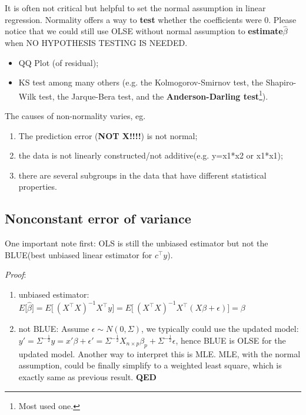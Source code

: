 It is often not critical but helpful to set the normal assumption in
linear regression. Normality offers a way to \textbf{test} whether the
coefficients were 0. Please notice that we could still use OLSE without
normal assumption to \textbf{estimate}\(\hat{\beta}\)when NO HYPOTHESIS
TESTING IS NEEDED.

\begin{itemize}
	\item
	QQ Plot (of residual);
	\item
	KS test among many others (e.g. the Kolmogorov-Smirnov test, the
	Shapiro-Wilk test, the Jarque-Bera test, and the
	\textbf{Anderson-Darling test}\footnote{Most used one.}).
\end{itemize}

The causes of non-normality varies, eg.

\begin{enumerate}
	\def\labelenumi{\alph{enumi}.}
	\item
	The prediction error (\textbf{NOT X!!!!}) is not normal;
	\item
	the data is not linearly constructed/not additive(e.g. y=x1*x2 or
	x1*x1);
	\item
	there are several subgroups in the data that have different
	statistical properties.
\end{enumerate}

\subsection{Nonconstant error of
	variance}\label{nonconstant-error-of-variance}

One important note first: OLS is still the unbiased estimator but not
the BLUE(best unbiased linear estimator for \(c^{\top}y\)).

\emph{Proof}:

\begin{enumerate}
	\def\labelenumi{\arabic{enumi}.}
	\item
	unbiased estimator:
	\(E\lbrack\hat{\beta}\rbrack = E\lbrack\ (X^{\top}X)^{- 1}X^{\top}y\rbrack = E\lbrack\ (X^{\top}X)^{- 1}X^{\top}(X\beta + \epsilon)\rbrack = \beta\ \)
	\item
	not BLUE: Assume \(\epsilon \sim N(0,\Sigma)\), we typically could use
	the updated model:
	\(y' = \Sigma^{- \frac{1}{2}}y = x'\beta + \epsilon' = \Sigma^{- \frac{1}{2}}X_{n \times p}\beta_{p} + \Sigma^{- \frac{1}{2}}\epsilon\),
	hence BLUE is OLSE for the updated model. Another way to interpret
	this is MLE. MLE, with the normal assumption, could be finally
	simplify to a weighted least square, which is exactly same as previous
	result. \textbf{QED}
\end{enumerate}

